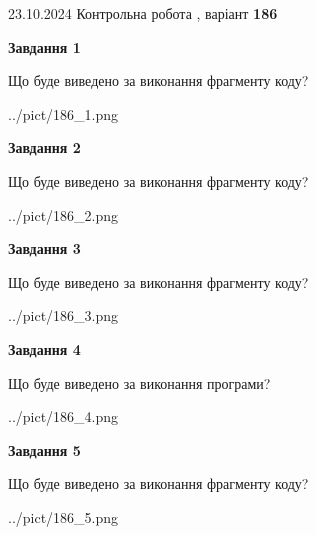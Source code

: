 \documentclass[12pt, ukrainian]{article}
\begin{document}
{\Large{23.10.2024 Контрольна робота , варіант  \No \textbf { 186 }\par}}
{
\begin {large}
{\begin {center}\textbf{Завдання 1}\end {center}}

Що буде виведено за виконання фрагменту коду?\par
\begin{center}
	{../pict/186_1.png}
\end{center}
\newpage

{\begin {center}\textbf{Завдання 2}\end {center}}

Що буде виведено за виконання фрагменту коду?\par
\begin{center}
	{../pict/186_2.png}
\end{center}
\newpage

{\begin {center}\textbf{Завдання 3}\end {center}}

Що буде виведено за виконання фрагменту коду?\par
\begin{center}
	{../pict/186_3.png}
\end{center}
\newpage

{\begin {center}\textbf{Завдання 4}\end {center}}

Що буде виведено за виконання програми?\par
\begin{center}
	{../pict/186_4.png}
\end{center}
\newpage

{\begin {center}\textbf{Завдання 5}\end {center}}

Що буде виведено за виконання фрагменту коду?\par
\begin{center}
	{../pict/186_5.png}
\end{center}
\newpage


\end{large}}
\end{document}
